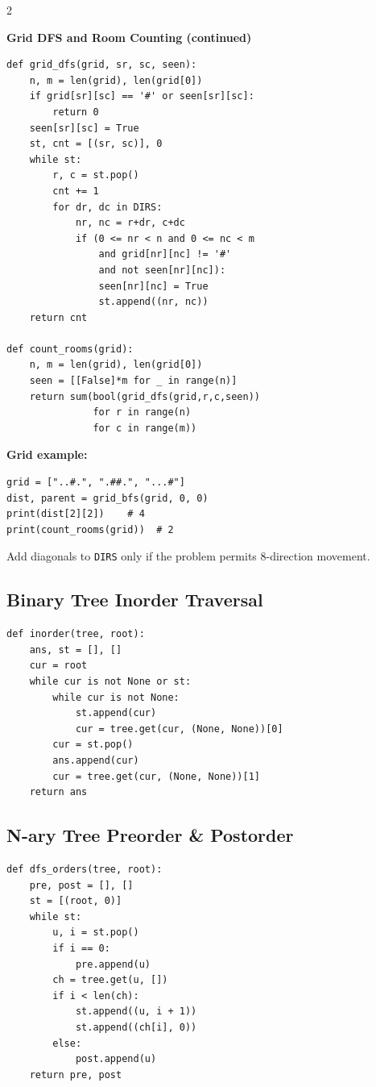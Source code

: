 \documentclass[9pt,a4paper]{extarticle}
\newcommand{\code}[1]{\texttt{#1}}
\begin{document}
\begin{multicols}{2}
\noindent\begin{minipage}[t]{\linewidth}
\textbf{Grid DFS and Room Counting (continued)}\par
\begin{lstlisting}
def grid_dfs(grid, sr, sc, seen):
    n, m = len(grid), len(grid[0])
    if grid[sr][sc] == '#' or seen[sr][sc]:
        return 0
    seen[sr][sc] = True
    st, cnt = [(sr, sc)], 0
    while st:
        r, c = st.pop()
        cnt += 1
        for dr, dc in DIRS:
            nr, nc = r+dr, c+dc
            if (0 <= nr < n and 0 <= nc < m
                and grid[nr][nc] != '#'
                and not seen[nr][nc]):
                seen[nr][nc] = True
                st.append((nr, nc))
    return cnt

def count_rooms(grid):
    n, m = len(grid), len(grid[0])
    seen = [[False]*m for _ in range(n)]
    return sum(bool(grid_dfs(grid,r,c,seen))
               for r in range(n)
               for c in range(m))
\end{lstlisting}
\textbf{Grid example:}
\begin{lstlisting}
grid = ["..#.", ".##.", "...#"]
dist, parent = grid_bfs(grid, 0, 0)
print(dist[2][2])    # 4
print(count_rooms(grid))  # 2
\end{lstlisting}
Add diagonals to \code{DIRS} only if the problem permits
8-direction movement.
\end{minipage}\par

\subsection{Binary Tree Inorder Traversal}
\begin{lstlisting}
def inorder(tree, root):
    ans, st = [], []
    cur = root
    while cur is not None or st:
        while cur is not None:
            st.append(cur)
            cur = tree.get(cur, (None, None))[0]
        cur = st.pop()
        ans.append(cur)
        cur = tree.get(cur, (None, None))[1]
    return ans
\end{lstlisting}

\par\noindent\begin{minipage}[t]{\linewidth}
\subsection{N-ary Tree Preorder \& Postorder}
\begin{lstlisting}
def dfs_orders(tree, root):
    pre, post = [], []
    st = [(root, 0)]
    while st:
        u, i = st.pop()
        if i == 0:
            pre.append(u)
        ch = tree.get(u, [])
        if i < len(ch):
            st.append((u, i + 1))
            st.append((ch[i], 0))
        else:
            post.append(u)
    return pre, post
\end{lstlisting}
\end{minipage}\par


\end{multicols}
\end{document}
